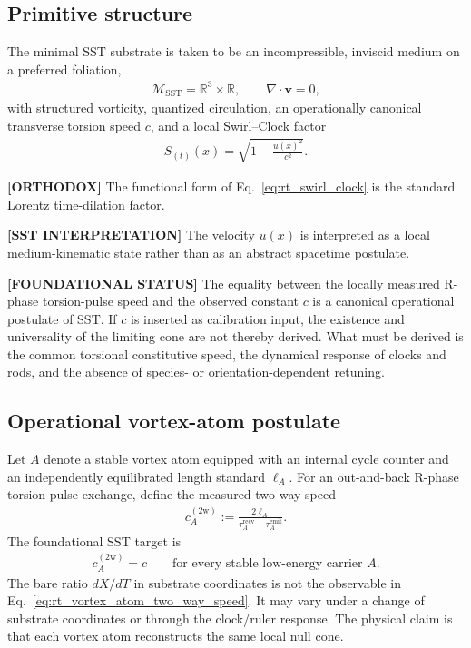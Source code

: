 \subsection{Primitive structure}

The minimal SST substrate is taken to be an incompressible, inviscid medium on a
preferred foliation,
\begin{align}
    \mathcal{M}_{\mathrm{SST}}
    =
    \mathbb{R}^3 \times \mathbb{R},
    \qquad
    \nabla\cdot \mathbf{v}=0 ,
\end{align}
with structured vorticity, quantized circulation, an operationally canonical
transverse torsion speed \(c\), and a local Swirl--Clock factor
\begin{align}
    S_{(t)}(x)
    =
    \sqrt{1-\frac{u(x)^2}{c^2}} .
    \label{eq:rt_swirl_clock}
\end{align}

\textbf{[ORTHODOX]} The functional form of
Eq.~\eqref{eq:rt_swirl_clock} is the standard Lorentz time-dilation factor.

\textbf{[SST INTERPRETATION]} The velocity \(u(x)\) is interpreted as a local
medium-kinematic state rather than as an abstract spacetime postulate.

\textbf{[FOUNDATIONAL STATUS]} The equality between the locally measured
R-phase torsion-pulse speed and the observed constant \(c\) is a canonical
operational postulate of SST. If \(c\) is inserted as calibration input, the
existence and universality of the limiting cone are not thereby derived. What
must be derived is the common torsional constitutive speed, the dynamical
response of clocks and rods, and the absence of species- or orientation-dependent
retuning.

\subsection{Operational vortex-atom postulate}

Let \(A\) denote a stable vortex atom equipped with an internal cycle counter and
an independently equilibrated length standard \(\ell_A\). For an out-and-back
R-phase torsion-pulse exchange, define the measured two-way speed
\begin{align}
    c_A^{(2\mathrm w)}
    :=
    \frac{2\ell_A}
    {\tau_A^{\mathrm{recv}}-\tau_A^{\mathrm{emit}}} .
    \label{eq:rt_vortex_atom_two_way_speed}
\end{align}
The foundational SST target is
\begin{align}
    \boxed{
    c_A^{(2\mathrm w)}=c
    }
    \qquad
    \text{for every stable low-energy carrier }A .
    \label{eq:rt_vortex_atom_luminal_postulate}
\end{align}
The bare ratio \(dX/dT\) in substrate coordinates is not the observable in
Eq.~\eqref{eq:rt_vortex_atom_two_way_speed}. It may vary under a change of
substrate coordinates or through the clock/ruler response. The physical claim is
that each vortex atom reconstructs the same local null cone.

